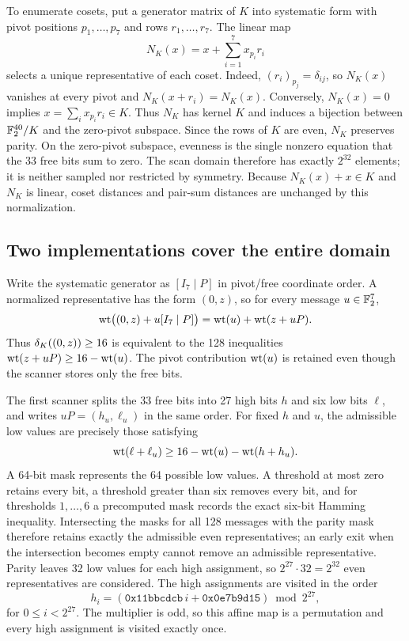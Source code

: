 To enumerate cosets, put a generator matrix of $K$ into systematic form with pivot positions $p_1,\ldots,p_7$ and rows $r_1,\ldots,r_7$. The linear map
\begin{equation}\label{eq:normalizer}
 N_K(x)=x+\sum_{i=1}^7 x_{p_i}r_i
\end{equation}
selects a unique representative of each coset. Indeed, $(r_i)_{p_j}=\delta_{ij}$, so $N_K(x)$ vanishes at every pivot and $N_K(x+r_i)=N_K(x)$. Conversely, $N_K(x)=0$ implies $x=\sum_i x_{p_i}r_i\in K$. Thus $N_K$ has kernel $K$ and induces a bijection between $\mathbb F_2^{40}/K$ and the zero-pivot subspace. Since the rows of $K$ are even, $N_K$ preserves parity. On the zero-pivot subspace, evenness is the single nonzero equation that the 33 free bits sum to zero. The scan domain therefore has exactly $2^{32}$ elements; it is neither sampled nor restricted by symmetry. Because $N_K(x)+x\in K$ and $N_K$ is linear, coset distances and pair-sum distances are unchanged by this normalization.

\subsection{Two implementations cover the entire domain}\label{sec:scans}
Write the systematic generator as $[I_7\mid P]$ in pivot/free coordinate order. A normalized representative has the form $(0,z)$, so for every message $u\in\mathbb F_2^7$,
\begin{equation}\label{eq:packed-distance}
 \operatorname{wt}\bigl((0,z)+u[I_7\mid P]\bigr)
 =\operatorname{wt}(u)+\operatorname{wt}(z+uP).
\end{equation}
Thus $\delta_K((0,z))\ge16$ is equivalent to the 128 inequalities $\operatorname{wt}(z+uP)\ge16-\operatorname{wt}(u)$. The pivot contribution $\operatorname{wt}(u)$ is retained even though the scanner stores only the free bits.

The first scanner splits the 33 free bits into 27 high bits $h$ and six low bits $\ell$, and writes $uP=(h_u,\ell_u)$ in the same order. For fixed $h$ and $u$, the admissible low values are precisely those satisfying
\[
 \operatorname{wt}(\ell+\ell_u)\ge16-\operatorname{wt}(u)-\operatorname{wt}(h+h_u).
\]
A 64-bit mask represents the 64 possible low values. A threshold at most zero retains every bit, a threshold greater than six removes every bit, and for thresholds $1,\ldots,6$ a precomputed mask records the exact six-bit Hamming inequality. Intersecting the masks for all 128 messages with the parity mask therefore retains exactly the admissible even representatives; an early exit when the intersection becomes empty cannot remove an admissible representative. Parity leaves 32 low values for each high assignment, so $2^{27}\cdot32=2^{32}$ even representatives are considered. The high assignments are visited in the order
\[
 h_i=(\mathtt{0x11bbcdcb}\,i+\mathtt{0x0e7b9d15})\bmod2^{27},
\]
for $0\le i<2^{27}$. The multiplier is odd, so this affine map is a permutation and every high assignment is visited exactly once.

